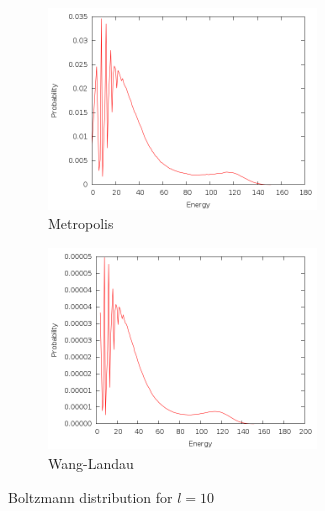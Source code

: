 \documentclass{article}
\begin{document}
\begin{figure}[H]
\begin{subfigure}[t]{2.8in}
    \includegraphics[width=2.8in]{../results/metropolis/m10.png}
    \caption{Metropolis}
    \label{fig:m10}
\end{subfigure}
\quad
\begin{subfigure}[t]{2.8in}
    \includegraphics[width=2.8in]{../results/wanglandau/b10.png}
    \caption{Wang-Landau}
    \label{fig:b10}
\end{subfigure}
\caption{Boltzmann distribution for $l = 10$}
\end{figure}
\end{document}
